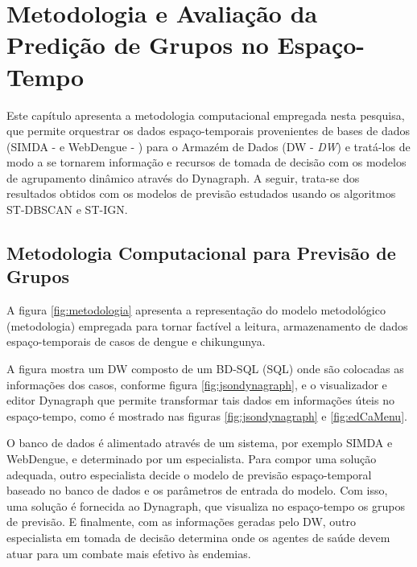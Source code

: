 \chapter{Metodologia e Avaliação da Predição de Grupos no Espaço-Tempo}
\label{chap:avaliacao}

Este capítulo apresenta a metodologia computacional empregada nesta pesquisa, que permite orquestrar os dados espaço-temporais provenientes de bases de dados (\acrshort{SIMDA} - \cite{simda} e WebDengue - \cite{webdengue2011}) para o Armazém de Dados (\acrshort{DW} - \textit{\acrlong{DW}}) e tratá-los de modo a se tornarem informação e recursos de tomada de decisão com os modelos de agrupamento dinâmico através do Dynagraph. A seguir, trata-se dos resultados obtidos com os modelos de previsão estudados usando os algoritmos \acrshort{ST-DBSCAN} e \acrshort{ST-IGN}.

\section{Metodologia Computacional para Previsão de Grupos}

A figura \ref{fig:metodologia} apresenta a representação do modelo metodológico (metodologia) empregada para tornar factível a leitura, armazenamento de dados espaço-temporais de casos de dengue e chikungunya. 

A figura mostra um \acrlong{DW} composto de um \acrfull{BD-SQL} (\acrfull{SQL}) onde são colocadas as informações dos casos, conforme figura \ref{fig:jsondynagraph}, e o visualizador e editor Dynagraph que permite transformar tais dados em informações úteis no espaço-tempo, como é mostrado nas figuras \ref{fig:jsondynagraph} e \ref{fig:edCaMenu}.

O banco de dados é alimentado através de um sistema, por exemplo SIMDA e WebDengue, e determinado por um especialista. Para compor uma solução adequada, outro especialista decide o modelo de previsão espaço-temporal baseado no banco de dados e os parâmetros de entrada do modelo. Com isso, uma solução é fornecida ao Dynagraph, que visualiza no espaço-tempo os grupos de previsão. E finalmente, com as informações geradas pelo \acrshort{DW}, outro especialista em tomada de decisão determina onde os agentes de saúde devem atuar para um combate mais efetivo às endemias.

